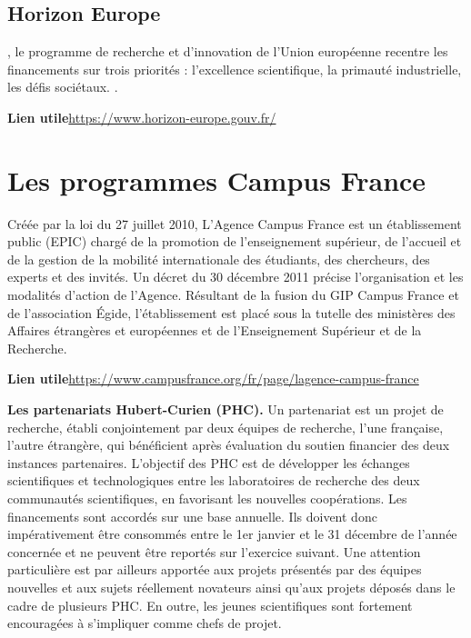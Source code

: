 \subsection{Horizon Europe}

, le programme de recherche et d'innovation de l'Union europ\'eenne 
recentre les financements sur trois priorit\'es : 
l'excellence scientifique, la primaut\'e industrielle, les d\'efis soci\'etaux. 
. 

\textbf{Lien utile\hspace{.5em}}\url{https://www.horizon-europe.gouv.fr/}


\section{Les programmes Campus France}

Cr\'e\'ee par la loi du 27 juillet 2010, L'Agence Campus France est un \'etablissement public (EPIC) charg\'e de la promotion de l'enseignement sup\'erieur, de l'accueil et de la gestion de la mobilit\'e internationale des \'etudiants, des chercheurs, des experts et des invit\'es. Un d\'ecret du 30 d\'ecembre 2011 pr\'ecise l'organisation et les modalit\'es d'action de l'Agence. R\'esultant de la fusion du GIP Campus France et de l'association \'Egide, l'\'etablissement est plac\'e sous la tutelle des minist\`eres des Affaires \'etrang\`eres et europ\'eennes et de l'Enseignement Sup\'erieur et de la Recherche.

\textbf{Lien utile\hspace{.5em}}\url{https://www.campusfrance.org/fr/page/lagence-campus-france}

\textbf{Les partenariats Hubert-Curien (PHC).\hspace{.5em}}
\label{PHC}
Un partenariat est un projet de recherche, {\'e}tabli conjointement par deux {\'e}quipes de recherche, l'une fran\c{c}aise, l'autre {\'e}trang{\`e}re, qui b{\'e}n{\'e}ficient apr{\`e}s {\'e}valuation du soutien financier des deux instances partenaires.
L'objectif des PHC est de d{\'e}velopper les {\'e}changes scientifiques et technologiques entre les laboratoires de recherche des deux communaut{\'e}s scientifiques, en favorisant les nouvelles coop{\'e}rations. 
Les financements sont accord\'es sur une base annuelle. Ils doivent donc imp\'erativement \^etre consomm\'es entre le 1er janvier et le 31 d\'ecembre de l'ann\'ee concern\'ee et ne peuvent \^etre report\'es sur l'exercice suivant.
Une attention particuli{\`e}re est par ailleurs apport{\'e}e aux projets pr{\'e}sent{\'e}s par des {\'e}quipes nouvelles et aux sujets r{\'e}ellement novateurs ainsi qu'aux projets d{\'e}pos{\'e}s dans le cadre de plusieurs PHC. En outre, les jeunes scientifiques sont fortement encourag{\'e}\mp e\mp s {\`a} s'impliquer comme chefs de projet.

